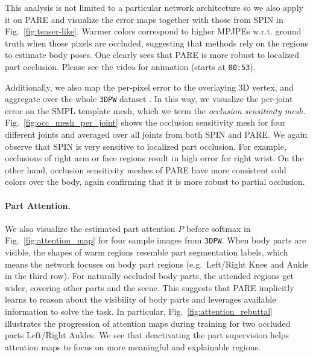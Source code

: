 \documentclass[10pt,twocolumn,letterpaper,usenames,dvipsnames]{article}
\newcommand{\methodname}{PARE\xspace}
\newcommand{\threedpw}{\texttt{3DPW}\xspace}
\renewcommand{\eg}{e.g.\xspace}
\begin{document}
This analysis is not limited to a particular network architecture so we also apply it on \methodname and visualize the error maps together with those from SPIN \cite{SPIN:ICCV:2019} in Fig.~\ref{fig:teaser-like}.
Warmer colors correspond to higher MPJPEs w.r.t. ground truth when those pixels are occluded, suggesting that methods rely on the regions to estimate body poses. 
One clearly sees that \methodname is more robust to localized part occlusion. Please see the video for animation (starts at \texttt{00:53}).

Additionally, we also map the per-pixel error to the overlaying 3D vertex, and aggregate over the whole \threedpw dataset \cite{vonMarcard2018_3dpw}. 
In this way, we visualize the per-joint error on the SMPL template mesh, which we term the \emph{occlusion sensitivity mesh}.
Fig.~\ref{fig:occ_mesh_per_joint} shows the occlusion sensitivity mesh for four different joints and averaged over all joints from both SPIN and \methodname. 
We again observe that SPIN is very sensitive to localized part occlusion. For example, occlusions of right arm or face regions result in high error for right wrist. 
On the other hand, occlusion sensitivity meshes of \methodname have more consistent cold colors over the body, again confirming that it is more robust to partial occlusion.

\paragraph{Part Attention.}
We also visualize the estimated part attention $P$ before softmax in Fig.~\ref{fig:attention_map} for four sample images from \threedpw \cite{vonMarcard2018_3dpw}. 
When body parts are visible, the shapes of warm regions resemble part segmentation labels, which means the network focuses on body part regions (\eg~Left/Right Knee and Ankle in the third row). For naturally occluded body parts, the attended regions get wider, covering other parts and the scene. 
This suggests that \methodname implicitly learns to reason about the visibility of body parts and leverages available information to solve the task.
In particular, Fig.~\ref{fig:attention_rebuttal} illustrates the progression of attention maps during training for two occluded parts Left/Right Ankles.
We see that deactivating the part supervision helps attention maps to focus on more meaningful and explainable regions.
\end{document}
